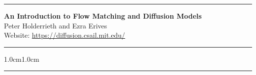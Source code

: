\documentclass[svgnames,dvipsnames]{article}
\date{}
\begin{document}
 
\vspace{0.0em}

\hrule
\vspace{0.7em}
\begin{center}
{\Large \bfseries \sffamily An Introduction to Flow Matching and Diffusion Models} \vspace{0.7em}\\
{\normalsize \sffamily 
Peter Holderrieth and Ezra Erives\\
\vspace{0.7em}
Website: \url{https://diffusion.csail.mit.edu/}}
\end{center}

\vspace{0.6em}

\hrule

\doparttoc

\begin{adjustwidth}{1.0cm}{1.0cm}
\tableofcontents
\end{adjustwidth}

\vspace{1.5em}
\hrule

\newpage

\newpage

\newpage

\newpage

\newpage

\newpage

% 
\newpage

% 
\printbibliography[
  heading=bibnumbered,
  title={References}
]

\appendix
\newpage

\newpage




% 
\newpage


% 
\end{document}
